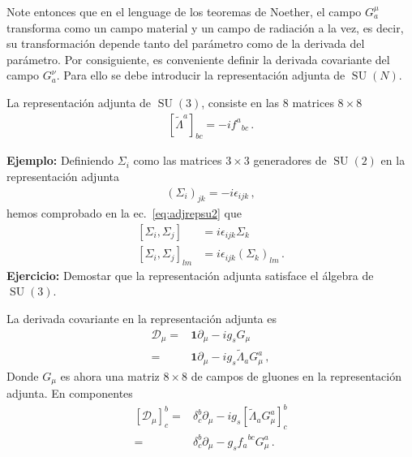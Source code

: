\begin{frame}

Note entonces que en el lenguage de los teoremas de Noether, el campo $G^{\mu}_{a}$ transforma como un campo material y un campo de radiación a la vez, es decir, su transformación depende tanto del parámetro como de la derivada del parámetro. Por consiguiente, es conveniente definir la derivada covariante del campo $G^{\nu}_{a}$. Para ello se debe introducir la representación adjunta de $\operatorname{SU}(N)$.


La representación adjunta de $\operatorname{SU}(3)$, consiste en las 8 matrices $8\times 8$
\begin{align}
  \left[  \widetilde{\Lambda}^{a}\right]_{bc}=-i {f^{a}}_{bc}\,.
\end{align}


\noindent
\textbf{Ejemplo:} Definiendo $\Sigma_i$ como las matrices $3\times3$ generadores de $\operatorname{SU}(2)$ en la representaci\'on adjunta
\begin{align}
  (\Sigma_i)_{jk}=-i\epsilon_{ijk}\,,
\end{align}
hemos comprobado en la ec.~\eqref{eq:adjrepsu2} que
\begin{align}
  \left[{\Sigma_i},{\Sigma_j}\right]&=i\epsilon_{ijk}{\Sigma_k}\nonumber\\
  \left[{\Sigma_i},{\Sigma_j}\right]_{lm}&=i\epsilon_{ijk}(\Sigma_k)_{lm}\,.
\end{align}
\noindent
\textbf{Ejercicio:} Demostar que la representación adjunta satisface el álgebra de $\operatorname{SU}(3)$.


La derivada covariante en la representación adjunta es
\begin{align}
  \mathcal{D}_{\mu}=&\mathbf{1}\partial_{\mu}-i g_s G_{\mu}  \nonumber\\
=&\mathbf{1}\partial_{\mu}-i g_s \widetilde{\Lambda}_a G_{\mu}^{a} \,,
\end{align}
Donde $G_{\mu}$ es ahora una matriz $8\times8$ de campos de gluones en la representación adjunta. En componentes
\begin{align}
 \left[\mathcal{D}_{\mu} \right]^b_c=&\delta^b_c\partial_{\mu}-i g_{s}\left[ \widetilde{\Lambda}_{a} G^a_{\mu} \right]^b_c \nonumber\\
                  =&\delta^b_c\partial_{\mu}- g_{s} {f_{a}}^{bc}  G^a_{\mu} \,.
\end{align}


\end{frame}
